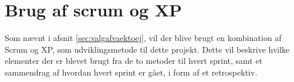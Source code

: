 \section{Brug af scrum og XP}\label{sec:brugafscrum}
Som nævnt i afsnit \ref{sec:valgafvaektoej}, vil der blive brugt en kombination af Scrum og XP, 
som udviklingsmetode til dette projekt. Dette vil beskrive hvilke elementer der er blevet brugt fra de
to metoder til hvert sprint, samt et sammendrag af hvordan hvert sprint er gået, i form af et retrospektiv.



